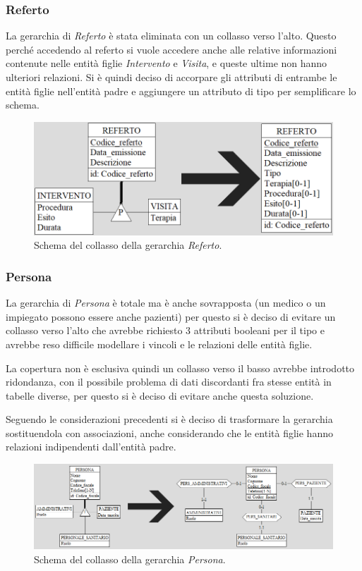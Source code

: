 \documentclass[a4paper,12pt]{report}
\begin{document}
\subsubsection*{Referto}
La gerarchia di \emph{Referto} è stata eliminata con un collasso verso l'alto. Questo perché accedendo al referto si vuole accedere anche alle relative
informazioni contenute nelle entità figlie \emph{Intervento} e \emph{Visita}, e queste ultime non hanno ulteriori relazioni. Si è quindi deciso di accorpare gli attributi 
di entrambe le entità figlie nell'entità padre e aggiungere un attributo di tipo per semplificare lo schema.
\begin{figure}[H]
	\centering{}
	\includegraphics[width=\textwidth]{img/ger_referto_complete.png}
	\caption{Schema del collasso della gerarchia \emph{Referto}.}
	\label{img:ger_referto_complete}
\end{figure}

\subsubsection*{Persona}
La gerarchia di \emph{Persona} è totale ma è anche sovrapposta (un medico o un impiegato possono essere anche pazienti) per questo si è deciso di 
evitare un collasso verso l'alto che avrebbe richiesto 3 attributi booleani per il tipo e avrebbe reso difficile modellare i vincoli e le relazioni
delle entità figlie.

La copertura non è esclusiva quindi un collasso verso il basso avrebbe introdotto ridondanza, con il possibile problema di dati discordanti fra stesse 
entità in tabelle diverse, per questo si è deciso di evitare anche questa soluzione.

Seguendo le considerazioni precedenti si è deciso di trasformare la gerarchia sostituendola con associazioni, anche considerando che le entità figlie hanno
relazioni indipendenti dall'entità padre.
\begin{figure}[H]
	\centering{}
	\includegraphics[width=\textwidth]{img/ger_persona_complete.png}
	\caption{Schema del collasso della gerarchia \emph{Persona}.}
	\label{img:ger_persona_complete}
\end{figure}
\end{document}
